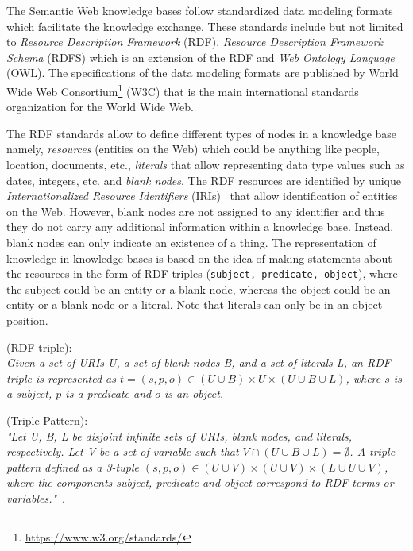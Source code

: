 The Semantic Web knowledge bases follow standardized data modeling formats which facilitate the knowledge exchange. These standards include but not limited to \textit{Resource Description Framework} (RDF),  \textit{Resource Description Framework Schema} (RDFS) which is an extension of the RDF and \textit{Web Ontology Language} (OWL). The specifications of the data modeling formats are published by World Wide Web Consortium\footnote{\url{https://www.w3.org/standards/}} (W3C) that is the main international standards organization for the World Wide Web.%

The RDF standards allow to define different types of nodes in a knowledge base namely, \textit{resources} (entities on the Web) which could be anything like people, location, documents, etc., \textit{literals} that allow representing data type values such as dates, integers, etc. and \textit{blank nodes}. %
The RDF resources are identified by unique \textit{Internationalized Resource Identifiers} (IRIs)~\cite{DBLP:journals/rfc/rfc3987} that allow identification of entities on the Web. However, blank nodes are not assigned to any identifier and thus they do not carry any additional information within a knowledge base. Instead, blank nodes can only indicate an existence of a thing. The representation of knowledge in knowledge bases is based on the idea of making statements about the resources in the form of RDF triples (\texttt{subject,  predicate, object}), where the subject could be an entity or a blank node, whereas the object could be an entity or a blank node or a literal. Note that literals can only be in an object position.
\theoremstyle{definition}
\begin{definition}{(RDF triple):\\}
\textit{Given a set of URIs U, a set of blank nodes B, and a set of literals L, an RDF triple is represented as $t=(s,p,o)\in (U \cup B) \times U \times (U \cup B \cup L)$, where $s$ is a subject, $p$ is a predicate and $o$ is an object.}
\end{definition}
\theoremstyle{definition}


\theoremstyle{definition}
\begin{definition}{(Triple Pattern):\\}
\textit{"Let U, B, L be disjoint infinite sets of URIs, blank nodes, and literals, respectively. Let V be a set of variable such that $V \cap (U\cup B \cup L) = \emptyset$. A triple pattern defined as a 3-tuple $(s, p, o) \in (U\cup V) \times (U\cup V)\times (L\cup U \cup V)$, where the components subject, predicate and object correspond to RDF terms or variables."}~\cite{DBLP:phd/dnb/Deibe18}.
\end{definition}
\theoremstyle{definition}

